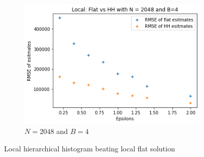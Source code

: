 \documentclass[11pt]{article}
\theoremstyle{definition}
\begin{document}
\begin{figure}[H]
\begin{subfigure}{.3\textwidth}
  \includegraphics[width=\linewidth]{figures/local_hh_flat/hh_beat_flat=2048_B=4.png}
  \caption{$N=2048$ and $B=4$}
  \label{fig:loc2048}
\end{subfigure}
\caption{Local hierarchical histogram beating local flat solution}
\label{fig:loc_hh_flat}
\end{figure}
\end{document}
